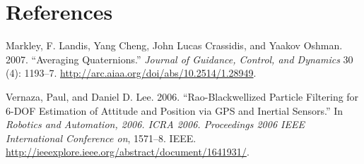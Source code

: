 \documentclass[]{article}
\begin{document}
\section*{References}\label{references}

\hypertarget{refs}{}
\hypertarget{ref-markley_averaging_2007}{}
Markley, F. Landis, Yang Cheng, John Lucas Crassidis, and Yaakov Oshman.
2007. ``Averaging Quaternions.'' \emph{Journal of Guidance, Control, and
Dynamics} 30 (4): 1193--7.
\url{http://arc.aiaa.org/doi/abs/10.2514/1.28949}.

\hypertarget{ref-vernaza_rao-blackwellized_2006}{}
Vernaza, Paul, and Daniel D. Lee. 2006. ``Rao-Blackwellized Particle
Filtering for 6-DOF Estimation of Attitude and Position via GPS and
Inertial Sensors.'' In \emph{Robotics and Automation, 2006. ICRA 2006.
Proceedings 2006 IEEE International Conference on}, 1571--8. IEEE.
\url{http://ieeexplore.ieee.org/abstract/document/1641931/}.
\end{document}

